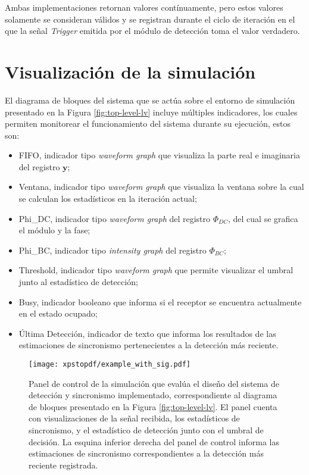 Ambas implementaciones retornan valores contínuamente, pero estos valores solamente se consideran válidos y se registran durante el ciclo de iteración en el que la señal \textit{Trigger} emitida por el módulo de detección toma el valor verdadero.

\section{Visualización de la simulación}

El diagrama de bloques del sistema que se actúa sobre el entorno de simulación presentado en la Figura \ref{fig:top-level-lv} incluye múltiples indicadores, los cuales permiten monitorear el funcionamiento del sistema durante su ejecución, estos son:
\begin{itemize}
    \item FIFO, indicador tipo \textit{waveform graph} que visualiza la parte real e imaginaria del registro $\mathbf{y}$;
    \item Ventana, indicador tipo \textit{waveform graph} que visualiza la ventana sobre la cual se calculan los estadísticos en la iteración actual;
    \item Phi\_DC, indicador tipo \textit{waveform graph} del registro $\Phi_{DC}$, del cual se grafica el módulo y la fase;
    \item Phi\_BC, indicador tipo \textit{intensity graph} del registro $\Phi_{BC}$;
    \item Threshold, indicador tipo \textit{waveform graph} que permite visualizar el umbral junto al estadístico de detección;
    \item Busy, indicador booleano que informa si el receptor se encuentra actualmente en el estado ocupado;
    \item Última Detección, indicador de texto que informa los resultados de las estimaciones de sincronismo pertenecientes a la detección más reciente.
\end{itemize}

\begin{figure}[t]
    \centering{}\texttt{[image: xpstopdf/example\_with\_sig.pdf]}
    \caption{Panel de control de la simulación que evalúa el diseño del sistema de detección y sincronismo implementado, correspondiente al diagrama de bloques presentado en la Figura \ref{fig:top-level-lv}. El panel cuenta con visualizaciones de la señal recibida, los estadísticos de sincronismo, y el estadístico de detección junto con el umbral de decisión. La esquina inferior derecha del panel de control informa las estimaciones de sincronismo correspondientes a la detección más reciente registrada.\label{fig:visualización-lv}}  
\end{figure}

